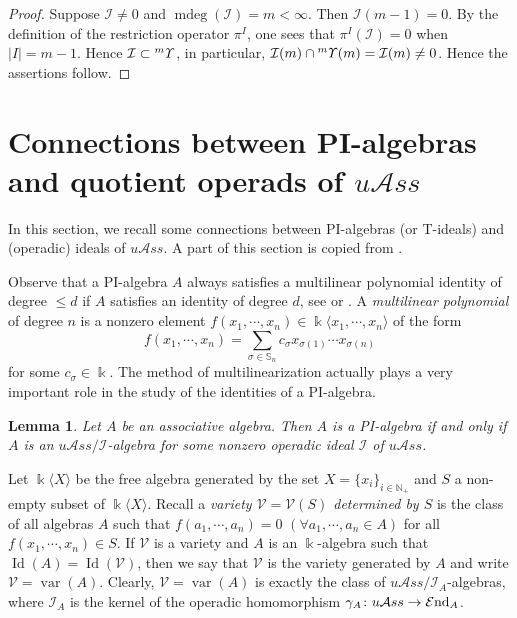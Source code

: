 \documentclass{amsart}
\newtheorem{lem}[thm]{Lemma}
\theoremstyle{definition}
\theoremstyle{remark}
\numberwithin{equation}{section}
\def\N{\mathbb{N}}
\def\S{\mathbb{S}}
\def\mdeg{\operatorname{mdeg}}
\newcommand{\lr}[1]{\langle #1 \rangle}
\newcommand{\up}[1]{{^{#1}{\it \!\Upsilon}}}
\def \uas{u\mathcal{A}ss}
\def \I{\mathcal{I}}
\def\iend{\mathcal{E}{\rm nd}}
\def \Id{\operatorname{Id}}
\def \N{\mathbb{N}}
\def \S{\mathbb{S}}
\begin{document}
\begin{proof}
Suppose $\I\neq 0$ and $\mdeg(\I)=m<\infty$. Then 
$\I(m-1)=0$. By the definition of the restriction operator 
$\pi^{I}$, one sees that $\pi^{I}(\I)=0$ when $|I|=m-1$.
Hence $\I\subset \up{m}$, in particular, $\I(m)\cap 
\up{m}(m)=\I(m)\neq 0$. Hence the assertions follow.
\end{proof}

\section{Connections between PI-algebras and quotient 
operads of $\uas$}
\label{yysec2}

In this section, we recall some connections between 
PI-algebras (or T-ideals) and (operadic) ideals of $\uas$.
A part of this section is copied from \cite{BXYZZ}.


Observe that a PI-algebra $A$ always satisfies a multilinear 
polynomial identity of degree $\le d$ if $A$ satisfies an 
identity of degree $d$, see \cite[Proposition 13.1.9]{MR} 
or \cite[Theorem 1.3.7]{GZ6}. A \textit{multilinear polynomial} 
of degree $n$ is a nonzero element $f(x_1, \cdots, x_n)\in 
\Bbbk\langle x_1, \cdots, x_n \rangle$ of the form
\[f(x_1, \cdots, x_n)=\sum_{\sigma\in \S_n} 
c_\sigma x_{\sigma(1)} \cdots x_{\sigma(n)}\]
for some $c_{\sigma}\in \Bbbk$. The method of 
multilinearization actually plays a very important role in 
the study of the identities of a PI-algebra.

\begin{lem}
\cite[Lemma 2.1]{BXYZZ}
\label{yylem2.1}
Let $A$ be an associative algebra. 
Then $A$ is a PI-algebra if and only if $A$ is an $\uas/\I$-algebra 
for some nonzero operadic ideal $\I$ of $\uas$.
\end{lem}


Let $\Bbbk\langle X \rangle$ be the free algebra generated 
by the set $X=\{x_i\}_{i\in \N_+}$ and $S$ a non-empty 
subset of $\Bbbk\lr{X}$. Recall a \textit{variety 
$\mathcal{V}=\mathcal{V}(S)$ determined by $S$} is the 
class of all algebras $A$ such that $f(a_1, \cdots, a_n)=0$
$(\forall a_1, \cdots, a_n\in A )$ for all 
$f(x_1, \cdots, x_n)\in S$. If $\mathcal{V}$ is a variety 
and $A$ is an $\Bbbk$-algebra such that 
$\Id(A)=\Id(\mathcal{V})$, then we say that $\mathcal{V}$ 
is the variety generated by $A$ and write 
$\mathcal{V}=\operatorname{var}(A)$. Clearly, 
$\mathcal{V}=\operatorname{var}(A)$ is exactly the class 
of $\uas/\I_A$-algebras, where $\I_A$ is the kernel of the 
operadic homomorphism $\gamma_A \colon \uas\to \iend_A$. 
\end{document}

